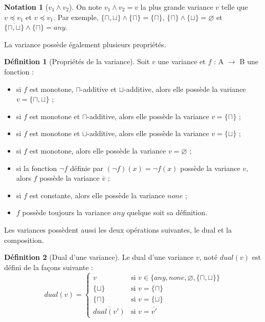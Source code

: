 \documentclass{rapport}
\theoremstyle{plain}
\theoremstyle{remark}
\theoremstyle{definition}
\newtheorem{notat}{Notation}
\newtheorem{dfn}{Définition}
\begin{document}
\begin{notat} [$v_1 \wedge v_2$] On note $v_1 \wedge v_2 = v$ la plus grande variance $v$ telle que $v \preccurlyeq v_1$ et $v \preccurlyeq v_1$. Par exemple, $\{\sqcap, \sqcup\} \wedge \{\sqcap\} = \{\sqcap\}$, $\{\sqcap\} \wedge \{\sqcup\} = \varnothing$ et $\overline{\{\sqcap, \sqcup\}} \wedge \{\sqcap\} = any$.
\end{notat}

La variance possède également plusieurs propriétés. 

\begin{dfn} [Propriétés de la variance] Soit $v$ une variance et $f$ : A $\rightarrow$ B une fonction : 
\begin{itemize}
	\item si $f$ est monotone, $\sqcap$-additive et $\sqcup$-additive, alors elle possède la variance $v = \{\sqcap, \sqcup\}$ ;
	\item si $f$ est monotone et $\sqcap$-additive, alors elle possède la variance $v = \{\sqcap\}$ ;
	\item si $f$ est monotone et $\sqcup$-additive, alors elle possède la variance $v = \{\sqcup\}$ ;
	\item si $f$ est monotone, alors elle possède la variance $v = \varnothing$ ;
	\item si la fonction $\neg f$ définie par $(\neg f)(x) = \neg f(x)$ possède la variance $v$, alors $f$ possède la variance $\overline{v}$ ;
	\item si $f$ est constante, alors elle possède la variance $none$ ;
	\item $f$ possède toujours la variance $any$ quelque soit sa définition.
\end{itemize}
\label{var:prop}
\end{dfn}

Les variances possèdent aussi les deux opérations suivantes, le dual et la composition.  

\begin{dfn} [Dual d'une variance] Le dual d'une variance $v$, noté $dual(v)$ est défini de la façons suivante : 
\[dual(v) = \left\{
\begin{array}{ll}
v & \text{si }v \in \{any, none, \varnothing, \{\sqcap, \sqcup\}\}\\
\{\sqcup\} & \text{si }v = \{\sqcap\}\\
\{\sqcap\} & \text{si }v = \{\sqcup\}\\
\overline{dual(v')} & \text{si }v = \overline{v'}
\end{array}\right.\]
\end{dfn}
\end{document}
